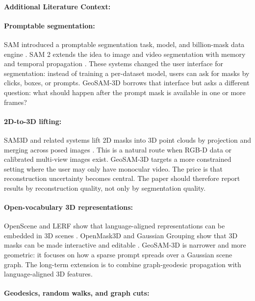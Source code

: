 \documentclass{article}
\begin{document}
\paragraph{Additional Literature Context:}

\paragraph{Promptable segmentation:}

SAM introduced a promptable segmentation task, model, and billion-mask data engine \citep{kirillov2023segment}. SAM 2 extends the idea to image and video segmentation with memory and temporal propagation \citep{ravi2024sam2}. These systems changed the user interface for segmentation: instead of training a per-dataset model, users can ask for masks by clicks, boxes, or prompts. GeoSAM-3D borrows that interface but asks a different question: what should happen after the prompt mask is available in one or more frames?

\paragraph{2D-to-3D lifting:}

SAM3D and related systems lift 2D masks into 3D point clouds by projection and merging across posed images \citep{yang2023sam3d}. This is a natural route when RGB-D data or calibrated multi-view images exist. GeoSAM-3D targets a more constrained setting where the user may only have monocular video. The price is that reconstruction uncertainty becomes central. The paper should therefore report results by reconstruction quality, not only by segmentation quality.

\paragraph{Open-vocabulary 3D representations:}

OpenScene and LERF show that language-aligned representations can be embedded in 3D scenes \citep{peng2023openscene,kerr2023lerf}. OpenMask3D and Gaussian Grouping show that 3D masks can be made interactive and editable \citep{takmaz2023openmask3d,ye2023gaussian}. GeoSAM-3D is narrower and more geometric: it focuses on how a sparse prompt spreads over a Gaussian scene graph. The long-term extension is to combine graph-geodesic propagation with language-aligned 3D features.

\paragraph{Geodesics, random walks, and graph cuts:}
\end{document}
